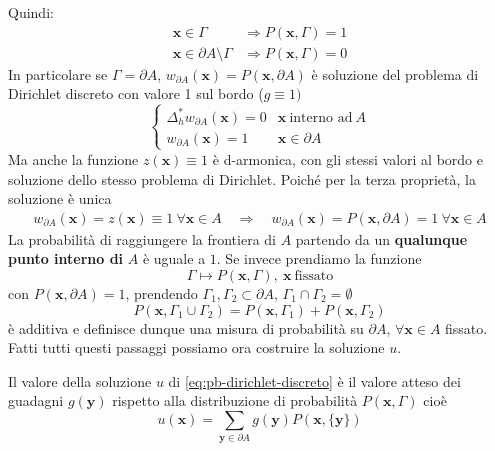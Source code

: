 \documentclass[10pt,a4paper,twoside,openright]{book}
\newcommand{\x}{\mathbf{x}}
\newcommand{\y}{\mathbf{y}}
\begin{document}
Quindi:
\begin{align*}
    \x\in \Gamma                    & \Rightarrow P(\x,\Gamma)=1 \\
    \x\in \partial A\setminus\Gamma & \Rightarrow P(\x,\Gamma)=0
\end{align*}
In particolare se $\Gamma =\partial A$, $w_{\partial A}(\x) =P(\x,\partial A)$ è soluzione del problema di Dirichlet discreto con valore 1 sul bordo ($g\equiv 1)$
\begin{equation*}
    \begin{cases}
        \Delta ^{*}_{h} w_{\partial A}(\x) =0 & \x\ \text{interno ad} \ A \\
        w_{\partial A}(\x) =1                 & \x\in \partial A
    \end{cases}
\end{equation*}
Ma anche la funzione $z(\x) \equiv 1$ è d-armonica, con gli stessi valori al bordo e soluzione dello stesso problema di Dirichlet. Poiché per la terza proprietà, la soluzione è unica
\begin{gather*}
    w_{\partial A}(\x) =z(\x) \equiv 1\ \forall \x\in A \quad \Rightarrow \quad w_{\partial A}(\x) =P(\x,\partial A) =1\ \forall \x\in A
\end{gather*}
La probabilità di raggiungere la frontiera di $A$ partendo da un \textbf{qualunque punto interno di} $A$ è uguale a $1$. Se invece prendiamo la funzione
\begin{equation*}
    \Gamma \longmapsto P(\x,\Gamma),\ \x\ \text{fissato}
\end{equation*}
con $P(\x,\partial A) =1$, prendendo $\Gamma _{1},\Gamma _{2} \subset \partial A$, $\Gamma _{1} \cap \Gamma _{2} =\emptyset $
\begin{equation*}
    P(\x,\Gamma _{1} \cup \Gamma _{2}) =P(\x,\Gamma _{1}) +P(\x,\Gamma _{2})
\end{equation*}
è additiva e definisce dunque una misura di probabilità su $\partial A$, $\forall \x\in A$ fissato. Fatti tutti questi passaggi possiamo ora costruire la soluzione $u$.
\begin{theorem}
    Il valore della soluzione $u$ di \eqref{eq:pb-dirichlet-discreto} è il valore atteso dei guadagni $g(\y)$ rispetto alla distribuzione di probabilità $P(\x,\Gamma)$ cioè
    \begin{equation*}
        u(\x) =\sum _{\y\in \partial A} g(\y) P(\x,\{\y\})
    \end{equation*}
\end{theorem}
\end{document}
